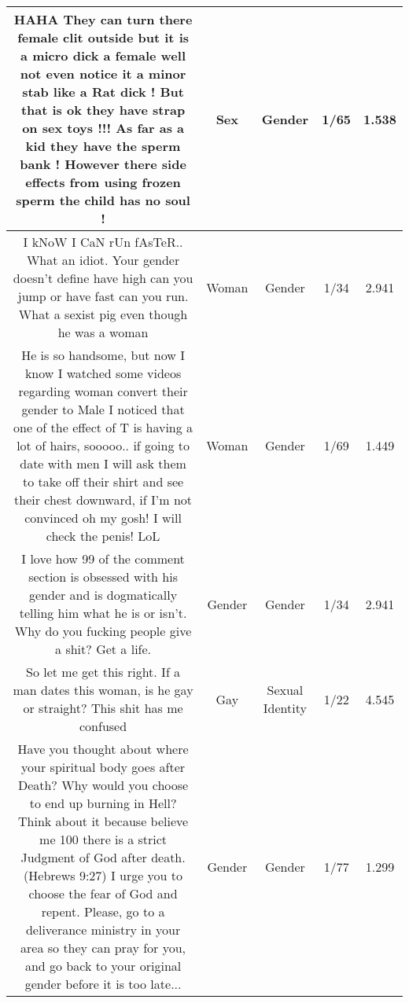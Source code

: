 \documentclass[11pt]{article}
\newlength\mylength
\begin{document}
\begin{center}
\begin{longtable}{|C{.40\mylength}|C{.30\mylength}|C{.15\mylength}|C{.15\mylength}|C{.15\mylength}|}
  HAHA    They can turn there female clit  outside but it is a micro dick a female well not  even notice it a minor stab like a Rat dick  !     But that is ok they have strap on sex toys !!!   As far as a kid they have the sperm bank !    However there side effects from using frozen sperm   the child has no soul !  & Sex & Gender & 1/65 & 1.538 \\  \hline
  I kNoW I CaN rUn fAsTeR.. What an idiot.  Your gender doesn't define have high can you jump or have fast can you run.  What a sexist pig even though he was a woman  & Woman & Gender & 1/34 & 2.941 \\  \hline
  He is so handsome, but now I know I watched some videos regarding woman convert their gender to Male I noticed that one of the effect of  T   is having a lot of hairs, sooooo.. if going to date with men I will ask them to take off their shirt and see their chest downward, if I'm not convinced oh my gosh! I will  check the penis! LoL            & Woman & Gender & 1/69 & 1.449 \\  \hline
  I love how 99  of the comment section is obsessed with his gender and is dogmatically telling him what he is or isn't. Why do you fucking people give a shit? Get a life.  & Gender & Gender & 1/34 & 2.941 \\  \hline
  So let me get this right. If a man dates this woman, is he gay or straight? This shit has me confused  & Gay & Sexual Identity & 1/22 & 4.545 \\  \hline
  Have you thought about where your spiritual body goes after Death? Why would you choose to end up burning in Hell? Think about it because believe me 100  there is a strict Judgment of God after death. (Hebrews 9:27) I urge you to choose the fear of God and repent. Please, go to a deliverance ministry in your area so they can pray for you, and go back to your original gender before it is too late...  & Gender & Gender & 1/77 & 1.299 \\  \hline

\end{longtable}
\end{center}
\end{document}
